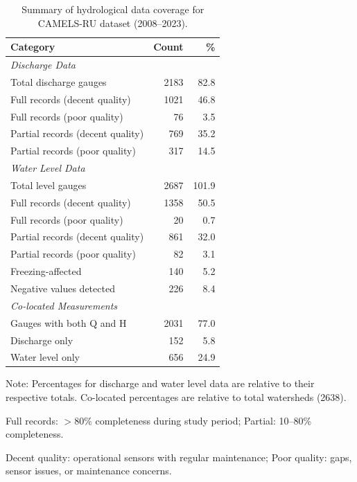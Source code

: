 \begin{table}[htbp]
\centering
\caption{Summary of hydrological data coverage for CAMELS-RU dataset (2008--2023).}
\label{tab:data_coverage}
\begin{tabular}{lrr}
\toprule
\textbf{Category} & \textbf{Count} & \textbf{\%} \\
\midrule
\multicolumn{3}{l}{\textit{Discharge Data}} \\
\quad Total discharge gauges & 2183 & 82.8 \\
\quad Full records (decent quality) & 1021 & 46.8 \\
\quad Full records (poor quality) & 76 & 3.5 \\
\quad Partial records (decent quality) & 769 & 35.2 \\
\quad Partial records (poor quality) & 317 & 14.5 \\
\midrule
\multicolumn{3}{l}{\textit{Water Level Data}} \\
\quad Total level gauges & 2687 & 101.9 \\
\quad Full records (decent quality) & 1358 & 50.5 \\
\quad Full records (poor quality) & 20 & 0.7 \\
\quad Partial records (decent quality) & 861 & 32.0 \\
\quad Partial records (poor quality) & 82 & 3.1 \\
\quad Freezing-affected & 140 & 5.2 \\
\quad Negative values detected & 226 & 8.4 \\
\midrule
\multicolumn{3}{l}{\textit{Co-located Measurements}} \\
\quad Gauges with both Q and H & 2031 & 77.0 \\
\quad Discharge only & 152 & 5.8 \\
\quad Water level only & 656 & 24.9 \\
\bottomrule
\end{tabular}
\begin{tablenotes}
\small
\item Note: Percentages for discharge and water level data are relative to their respective totals. Co-located percentages are relative to total watersheds (2638).
\item Full records: $>$80\% completeness during study period; Partial: 10--80\% completeness.
\item Decent quality: operational sensors with regular maintenance; Poor quality: gaps, sensor issues, or maintenance concerns.
\end{tablenotes}
\end{table}
